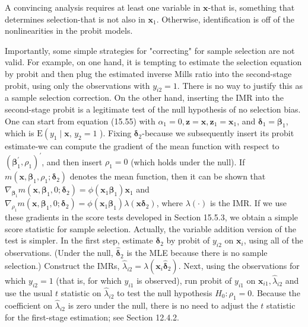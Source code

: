 \documentclass[10pt]{article}
\begin{document}
A convincing analysis requires at least one variable in $\mathbf{x}$-that is, something that determines selection-that is not also in $\mathbf{x}_{1}$. Otherwise, identification is off of the nonlinearities in the probit models.

Importantly, some simple strategies for "correcting" for sample selection are not valid. For example, on one hand, it is tempting to estimate the selection equation by probit and then plug the estimated inverse Mills ratio into the second-stage probit, using only the observations with $y_{i 2}=1$. There is no way to justify this as a sample selection correction. On the other hand, inserting the IMR into the second-stage probit is a legitimate test of the null hypothesis of no selection bias. One can start from equation (15.55) with $\alpha_{1}=0, \mathbf{z}=\mathbf{x}, \mathbf{z}_{1}=\mathbf{x}_{1}$, and $\boldsymbol{\delta}_{1}=\boldsymbol{\beta}_{1}$, which is $\mathrm{E}\left(y_{1} \mid \mathbf{x}\right.$, $y_{2}=1$ ). Fixing $\boldsymbol{\delta}_{2}$-because we subsequently insert its probit estimate-we can compute the gradient of the mean function with respect to $\left(\boldsymbol{\beta}_{1}^{\prime}, \rho_{1}\right)^{\prime}$, and then insert $\rho_{1}=0$ (which holds under the null). If $m\left(\mathbf{x}, \boldsymbol{\beta}_{1}, \rho_{1} ; \boldsymbol{\delta}_{2}\right)$ denotes the mean function, then it can be shown that $\nabla_{\boldsymbol{\beta}_{1}} m\left(\mathbf{x}, \boldsymbol{\beta}_{1}, 0 ; \boldsymbol{\delta}_{2}\right)=\phi\left(\mathbf{x}_{1} \boldsymbol{\beta}_{1}\right) \mathbf{x}_{1}$ and $\nabla_{\rho_{1}} m\left(\mathbf{x}, \boldsymbol{\beta}_{1}, 0 ; \boldsymbol{\delta}_{2}\right)= \phi\left(\mathbf{x}_{1} \boldsymbol{\beta}_{1}\right) \lambda\left(\mathbf{x} \boldsymbol{\delta}_{2}\right)$, where $\lambda(\cdot)$ is the IMR. If we use these gradients in the score tests developed in Section 15.5.3, we obtain a simple score statistic for sample selection. Actually, the variable addition version of the test is simpler. In the first step, estimate $\boldsymbol{\delta}_{2}$ by probit of $y_{i 2}$ on $\mathbf{x}_{i}$, using all of the observations. (Under the null, $\hat{\boldsymbol{\delta}}_{2}$ is the MLE because there is no sample selection.) Construct the IMRs, $\hat{\lambda}_{i 2}=\lambda\left(\mathbf{x}_{i} \hat{\boldsymbol{\delta}}_{2}\right)$. Next, using the observations for which $y_{i 2}=1$ (that is, for which $y_{i 1}$ is observed), run probit of $y_{i 1}$ on $\mathbf{x}_{i 1}, \hat{\lambda}_{i 2}$ and use the usual $t$ statistic on $\hat{\lambda}_{i 2}$ to test the null hypothesis $H_{0}: \rho_{1}=0$. Because the coefficient on $\hat{\lambda}_{i 2}$ is zero under the null, there is no need to adjust the $t$ statistic for the first-stage estimation; see Section 12.4.2.
\end{document}

